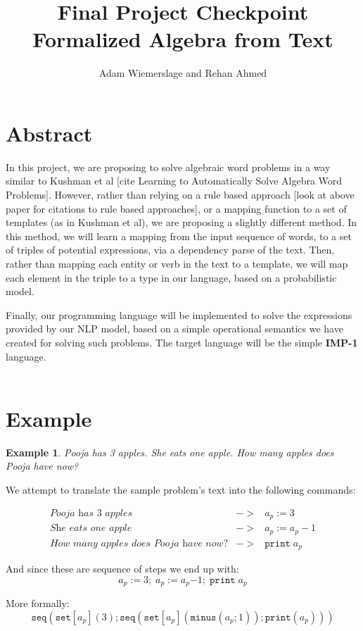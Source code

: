 \documentclass[11pt]{exam}
\title{Final Project Checkpoint\\Formalized Algebra from Text}
\author{Adam Wiemerslage and Rehan Ahmed}
\newcommand{\fmtkw}[1]{\mathtt{#1}}
\newcommand{\minusa}[2]{\ensuremath{\fmtkw{minus}(#1; #2)}}
\newcommand{\minusc}[2]{\ensuremath{#1 \mathbin{\fmtkw{-}} #2}}
\newcommand{\seta}[2]{\ensuremath{\fmtkw{set}[#1](#2)}}
\newcommand{\setc}[2]{\ensuremath{#1 \mathrel{\fmtkw{:=}} #2}}
\newcommand{\seqa}[2]{\ensuremath{\fmtkw{seq}(#1; #2)}}
\newcommand{\seqc}[2]{\ensuremath{#1\fmtkw{;}\;#2}}
\newcommand{\printa}[1]{\ensuremath{\fmtkw{print}(#1)}}
\newcommand{\printc}[1]{\ensuremath{\fmtkw{print}\; #1}}
\newcommand{\IMP}{\textbf{\textsf{IMP-1}}\xspace}
\newtheorem{problem}{Example}
\begin{document}
\maketitle
\section{Abstract}
In this project, we are proposing to solve algebraic word problems in a way similar to Kushman et al [cite Learning to Automatically Solve Algebra Word Problems]. However, rather than relying on a rule based approach [look at above paper for citations to rule based approaches], or a mapping function to a set of templates (as in Kushman et al), we are proposing a slightly different method. In this method, we will learn a mapping from the input sequence of words, to a set of triples of potential expressions, via a dependency parse of the text. Then, rather than mapping each entity or verb in the text to a template, we will map each element in the triple to a type in our language, based on a probabilistic model.

Finally, our programming language will be implemented to solve the expressions provided by our NLP model, based on a simple operational semantics we have created for solving such problems. The target language will be the simple \IMP language.\\\\

\section{Example}
\begin{problem}
	Pooja has 3 apples. She eats one apple. How many apples does Pooja have now?
\end{problem}
We attempt to translate the sample problem's text into the following commands:

\[\begin{array}{lrcllL}
\textit{Pooja has 3 apples} & -> & \setc{a_p}{3}
\\
\textit{She eats one apple} & -> & \setc{a_p}{a_p - 1}
\\
\textit{How many apples does Pooja have now?} & -> & \printc{a_p}
\end{array}\]

And since these are sequence of steps we end up with:
\[
	\seqc{\setc{a_p}{3}}{\seqc{\setc{a_p}{\minusc{a_p}{1}}}{\printc{a_p}}}
\]

More formally:
\[
\seqa{\seta{a_p}{3}}{\seqa{\seta{a_p}{\minusa{a_p}{1}}}{\printa{a_p}}}
\]
\end{document}
